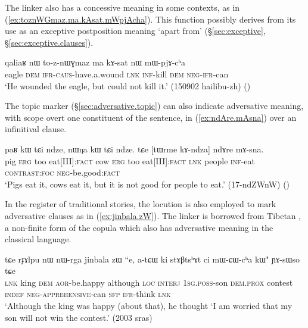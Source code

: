 The linker  also has a concessive meaning in some contexts, as in (\ref{ex:toznWGmaz.ma.kAsat.mWpjAcha}). This function possibly derives from its use as an exceptive postposition meaning `apart from' (§\ref{sec:exceptive}, §\ref{sec:exceptive.clauses}).
 
\begin{exe}
\ex \label{ex:toznWGmaz.ma.kAsat.mWpjAcha}
\gll qaliaʁ nɯ to-z-nɯɣmaz ma kɤ-sat nɯ mɯ-pjɤ-cʰa\\
eagle \textsc{dem} \textsc{ifr}-\textsc{caus}-have.a.wound \textsc{lnk} \textsc{inf}-kill \textsc{dem} \textsc{neg}-\textsc{ifr}-can\\
\glt `He wounded the eagle, but could not kill it.' (150902 hailibu-zh)
()
\end{exe}  
 
The topic marker  (§\ref{sec:adversative.topic}) can also indicate adversative meaning, with scope overt one constituent of the sentence, in (\ref{ex:ndAre.mAsna}) over an infinitival clause.
 
\begin{exe}
\ex \label{ex:ndAre.mAsna}
\gll paʁ kɯ tɕi ndze, nɯŋa kɯ tɕi ndze. tɕe [tɯrme kɤ-ndza] ndɤre mɤ-sna.   \\
pig \textsc{erg} too eat[III]:\textsc{fact} cow  \textsc{erg} too eat[III]:\textsc{fact} \textsc{lnk} people \textsc{inf}-eat  \textsc{contrast}:\textsc{foc}  \textsc{neg}-be.good:\textsc{fact} \\
\glt `Pigs eat it, cows eat it, but it is not good for people to eat.'  (17-ndZWnW)
()
\end{exe} 

In the register of traditional stories, the locution  is also employed to mark adversative clauses as in (\ref{ex:jinbala.zW}). The linker  is borrowed from Tibetan , a non-finite form of the copula  which also has adversative meaning in the classical language.

\begin{exe}
\ex \label{ex:jinbala.zW}
\gll tɕe rɟɤlpu nɯ nɯ-rga jinbala zɯ ``e, a-tɕɯ ki stɤβtsʰɤt ci mɯ-ɕɯ-cʰa kɯ" ɲɤ-sɯso tɕe \\
\textsc{lnk} king \textsc{dem} \textsc{aor}-be.happy although \textsc{loc} \textsc{interj} \textsc{1sg}.\textsc{poss}-son \textsc{dem}.\textsc{prox} contest \textsc{indef} \textsc{neg}-\textsc{apprehensive}-can \textsc{sfp} \textsc{ifr}-think \textsc{lnk} \\
\glt `Although the king was happy (about that), he thought `I am worried that my son will not win the contest.' (2003 sras)
\end{exe} 

